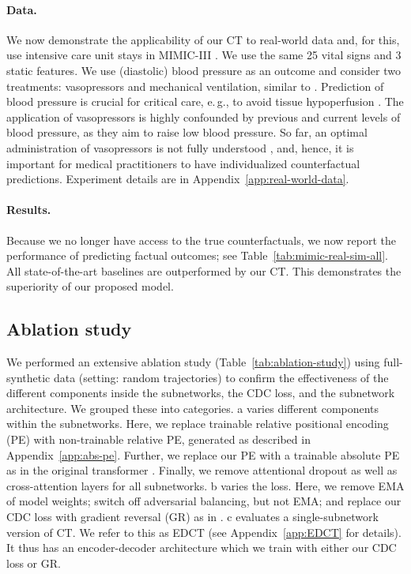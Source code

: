 \documentclass{article}
\newcommand\eg{e.\,g.\xspace}
\theoremstyle{plain}
\theoremstyle{definition}
\theoremstyle{remark}
\newcommand{\shortname}{CT\xspace}
\begin{document}
\paragraph{Data.} We now demonstrate the applicability of our \shortname to real-world data and, for this, use intensive care unit stays in MIMIC-III \cite{johnson2016mimic}. We use the same 25 vital signs and 3 static features. We use (diastolic) blood pressure as an outcome and consider two treatments: vasopressors and mechanical ventilation, similar to \cite{kuzmanovic2021deconfounding, hatt2021sequential}. Prediction of blood pressure is crucial for critical care, \eg, to avoid tissue hypoperfusion \cite{vincent2018mean}. The application of vasopressors is highly confounded by previous and current levels of blood pressure, as they aim to raise low blood pressure. So far, an optimal administration of vasopressors is not fully understood \cite{subramanian2008liberal}, and, hence, it is important for medical practitioners to have individualized counterfactual predictions. Experiment details are in Appendix~\ref{app:real-world-data}. 

\paragraph{Results.} Because we no longer have access to the true counterfactuals, we now report the performance of predicting factual outcomes; see Table~\ref{tab:mimic-real-sim-all}. All state-of-the-art baselines are outperformed by our \shortname. This demonstrates the superiority of our proposed model. 


\subsection{Ablation study} \label{sec:ablation}

We performed an extensive ablation study (Table~\ref{tab:ablation-study}) using full-synthetic data (setting: random trajectories) to confirm the effectiveness of the different components inside the subnetworks, the CDC loss, and the subnetwork architecture. We grouped these into categories. \textsf{a} varies different components within the subnetworks. Here, we replace trainable relative positional encoding (PE) with non-trainable relative PE, generated as described in Appendix~\ref{app:abs-pe}. Further, we replace our PE with a trainable absolute PE as in the original transformer \cite{vaswani2017attention}. Finally, we remove attentional dropout as well as cross-attention layers for all subnetworks. \textsf{b} varies the loss. Here, we remove EMA of model weights; switch off adversarial balancing, but not EMA; and replace our CDC loss with gradient reversal (GR) as in \cite{bica2020estimating}. \textsf{c} evaluates a single-subnetwork version of \shortname. We refer to this as EDCT (see Appendix~\ref{app:EDCT} for details). It thus has an encoder-decoder architecture which we train with either our CDC loss or GR.
\end{document}
